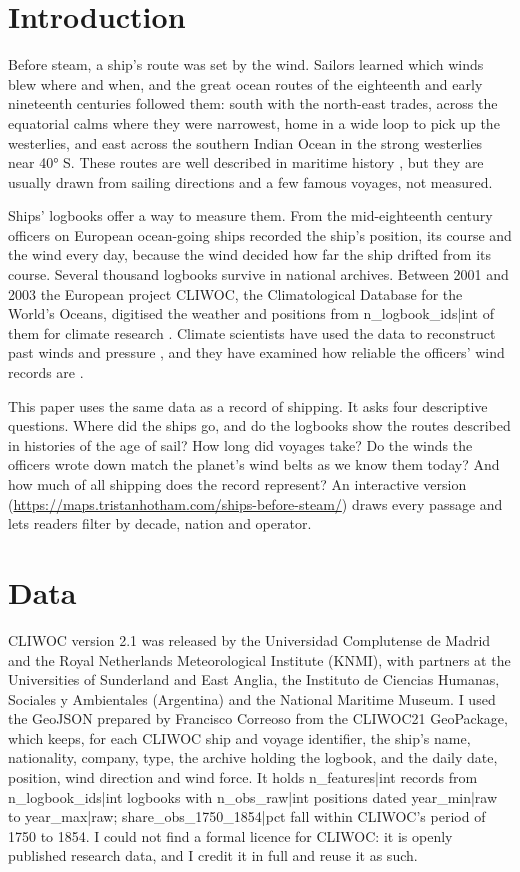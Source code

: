 \documentclass[11pt,a4paper]{article}
\begin{document}
\section{Introduction}
Before steam, a ship's route was set by the wind. Sailors learned which winds blew where and when, and the great ocean routes of the eighteenth and early nineteenth centuries followed them: south with the north-east trades, across the equatorial calms where they were narrowest, home in a wide loop to pick up the westerlies, and east across the southern Indian Ocean in the strong westerlies near 40° S. These routes are well described in maritime history \citep{bruijn1987}, but they are usually drawn from sailing directions and a few famous voyages, not measured.

Ships' logbooks offer a way to measure them. From the mid-eighteenth century officers on European ocean-going ships recorded the ship's position, its course and the wind every day, because the wind decided how far the ship drifted from its course. Several thousand logbooks survive in national archives. Between 2001 and 2003 the European project CLIWOC, the Climatological Database for the World's Oceans, digitised the weather and positions from {{n_logbook_ids|int}} of them for climate research \citep{garciaherrera2005}. Climate scientists have used the data to reconstruct past winds and pressure \citep{kuttel2010}, and they have examined how reliable the officers' wind records are \citep{wheeler2005}.

This paper uses the same data as a record of shipping. It asks four descriptive questions. Where did the ships go, and do the logbooks show the routes described in histories of the age of sail? How long did voyages take? Do the winds the officers wrote down match the planet's wind belts as we know them today? And how much of all shipping does the record represent? An interactive version (\url{https://maps.tristanhotham.com/ships-before-steam/}) draws every passage and lets readers filter by decade, nation and operator.

\section{Data}
CLIWOC version 2.1 was released by the Universidad Complutense de Madrid and the Royal Netherlands Meteorological Institute (KNMI), with partners at the Universities of Sunderland and East Anglia, the Instituto de Ciencias Humanas, Sociales y Ambientales (Argentina) and the National Maritime Museum. I used the GeoJSON prepared by Francisco Correoso \citep{correoso} from the CLIWOC21 GeoPackage, which keeps, for each CLIWOC ship and voyage identifier, the ship's name, nationality, company, type, the archive holding the logbook, and the daily date, position, wind direction and wind force. It holds {{n_features|int}} records from {{n_logbook_ids|int}} logbooks with {{n_obs_raw|int}} positions dated {{year_min|raw}} to {{year_max|raw}}; {{share_obs_1750_1854|pct}} fall within CLIWOC's period of 1750 to 1854. I could not find a formal licence for CLIWOC: it is openly published research data, and I credit it in full and reuse it as such.
\end{document}
